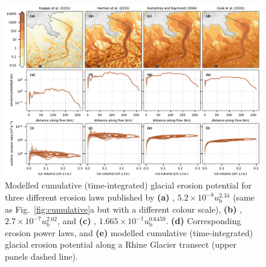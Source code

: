 \documentclass[utf8]{article}
\begin{document}
    \begin{figure}
      \centerline{\includegraphics{alpero_powerlaws}}
      \caption{%
        Modelled cumulative (time-integrated) glacial erosion potential for
        three different erosion laws published by
        \textbf{(a)} \citet{Koppes.etal.2015},
          ${5.2 \times 10^{-8} u_\mathrm{b}^{2.34}}$ (same as
          Fig.~\ref{fig:cumulative}a but with a different colour scale),
        \textbf{(b)} \citet{Herman.etal.2015},
          ${2.7 \times 10^{-7} u_\mathrm{b}^{2.02}}$, and
        \textbf{(c)} \citet{Cook.etal.2020},
          ${1.665 \times 10^{-1} u_\mathrm{b}^{0.6459}}$.
        \textbf{(d)} Corresponding erosion power laws, and
        \textbf{(e)} modelled cumulative (time-integrated) glacial erosion
          potential along a Rhine Glacier transect (upper panels dashed line).}
      \label{fig:powerlaws}
    \end{figure}



\end{document}
